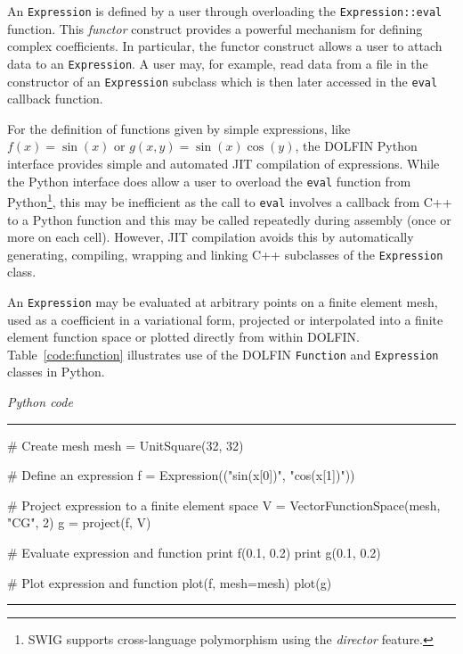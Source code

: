\documentclass[acmtoms]{acmtrans2m}
\newenvironment{pythoncode}[1]{\center\minipage{#1\textwidth}\footnotesize\hfill\it Python code \rm\vspace{0.1cm}\hrule\renewcommand{\baselinestretch}{0.9}\footnotesize\verbatim}{\endverbatim\hrule\normalsize\endminipage\newline\endcenter}
\newcommand{\emp}[1]{\texttt{#1}}
\newcommand{\dolfin}{DOLFIN}
\begin{document}
An \emp{Expression} is defined by a user through overloading the
\emp{Expression::eval} function. This \emph{functor} construct
provides a powerful mechanism for defining complex coefficients. In
particular, the functor construct allows a user to attach data to an
\emp{Expression}. A user may, for example, read data from a file
in the constructor of an \emp{Expression} subclass which is then later
accessed in the \emp{eval} callback function.

For the definition of functions given by simple expressions, like
$f(x) = \sin(x)$ or $g(x, y) = \sin(x) \cos(y)$, the \dolfin{} Python
interface provides simple and automated JIT compilation of
expressions. While the Python interface does allow a user to overload
the \emp{eval} function from Python\footnote{SWIG supports
  cross-language polymorphism using the \emph{director} feature.},
this may be inefficient as the call to \emp{eval} involves a callback
from C++ to a Python function and this may be called repeatedly during
assembly (once or more on each cell). However, JIT compilation avoids
this by automatically generating, compiling, wrapping and linking C++
subclasses of the \emp{Expression} class.

An \emp{Expression} may be evaluated at arbitrary points on a finite
element mesh, used as a coefficient in a variational form, projected
or interpolated into a finite element function space or plotted
directly from within \dolfin{}. Table~\ref{code:function} illustrates
use of the \dolfin{} \emp{Function} and \emp{Expression} classes in
Python.

\begin{table}
  \begin{center}
    \begin{pythoncode}{0.9}
# Create mesh
mesh = UnitSquare(32, 32)

# Define an expression
f = Expression(("sin(x[0])", "cos(x[1])"))

# Project expression to a finite element space
V = VectorFunctionSpace(mesh, "CG", 2)
g = project(f, V)

# Evaluate expression and function
print f(0.1, 0.2)
print g(0.1, 0.2)

# Plot expression and function
plot(f, mesh=mesh)
plot(g)
    \end{pythoncode}
    \caption{Defining, projecting, evaluating and plotting expressions
      and functions using the \dolfin{} Python interface.}
    \label{code:function}
  \end{center}
\end{table}
\end{document}
